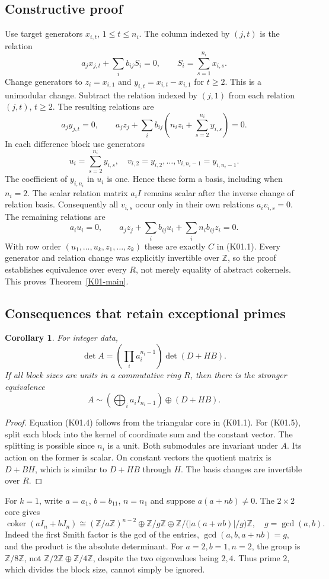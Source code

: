 \documentclass[11pt,a4paper]{article}
\newtheorem{corollary}[theorem]{Corollary}
\theoremstyle{definition}\newtheorem{definition}[theorem]{Definition}
\theoremstyle{remark}\newtheorem{remark}[theorem]{Remark}
\newcommand{\Z}{\mathbb Z}\newcommand{\Q}{\mathbb Q}\newcommand{\F}{\mathbb F}
\DeclareMathOperator{\coker}{coker}\DeclareMathOperator{\diag}{diag}\DeclareMathOperator{\rank}{rank}
\numberwithin{equation}{section}
\begin{document}
\subsection{Constructive proof}\label{K01-sec-2}
Use target generators $x_{i,t}$, $1\leq t\leq n_i$. The column indexed by $(j,t)$ is the relation
\[
 a_jx_{j,t}+\sum_i b_{ij}S_i=0,
 \qquad S_i=\sum_{s=1}^{n_i}x_{i,s}.
\]
Change generators to $z_i=x_{i,1}$ and $y_{i,t}=x_{i,t}-x_{i,1}$ for $t\geq2$. This is a unimodular change. Subtract the relation indexed by $(j,1)$ from each relation $(j,t)$, $t\geq2$. The resulting relations are
\[
 a_jy_{j,t}=0,\qquad
 a_jz_j+\sum_i b_{ij}\left(n_iz_i+\sum_{s=2}^{n_i}y_{i,s}\right)=0. \tag{K01.3}
\]
In each difference block use generators
\[
 u_i=\sum_{s=2}^{n_i}y_{i,s},\quad
 v_{i,2}=y_{i,2},\ldots,v_{i,n_i-1}=y_{i,n_i-1}.
\]
The coefficient of $y_{i,n_i}$ in $u_i$ is one. Hence these form a basis, including when $n_i=2$. The scalar relation matrix $a_iI$ remains scalar after the inverse change of relation basis. Consequently all $v_{i,s}$ occur only in their own relations $a_iv_{i,s}=0$. The remaining relations are
\[
 a_iu_i=0,\qquad
 a_jz_j+\sum_i b_{ij}u_i+\sum_i n_ib_{ij}z_i=0.
\]
With row order $(u_1,\ldots,u_k,z_1,\ldots,z_k)$ these are exactly $C$ in (K01.1). Every generator and relation change was explicitly invertible over $\Z$, so the proof establishes equivalence over every $R$, not merely equality of abstract cokernels. This proves Theorem~\ref{K01-main}.

\subsection{Consequences that retain exceptional primes}\label{K01-sec-3}
\begin{corollary}
For integer data,
\[
 \det A=\left(\prod_i a_i^{n_i-1}\right)\det(D+HB).               \tag{K01.4}
\]
If all block sizes are units in a commutative ring $R$, then there is the stronger equivalence
\[
 A\sim\left(\bigoplus_i a_iI_{n_i-1}\right)\oplus(D+HB).          \tag{K01.5}
\]
\end{corollary}
\begin{proof}
Equation (K01.4) follows from the triangular core in (K01.1). For (K01.5), split each block into the kernel of coordinate sum and the constant vector. The splitting is possible since $n_i$ is a unit. Both submodules are invariant under $A$. Its action on the former is scalar. On constant vectors the quotient matrix is $D+BH$, which is similar to $D+HB$ through $H$. The basis changes are invertible over $R$.
\end{proof}
For $k=1$, write $a=a_1$, $b=b_{11}$, $n=n_1$ and suppose $a(a+nb)\ne0$. The $2\times2$ core gives
\[
 \coker(aI_n+bJ_n)\cong
 (\Z/a\Z)^{n-2}\oplus\Z/g\Z\oplus\Z/\bigl(|a(a+nb)|/g\bigr)\Z,
 \quad g=\gcd(a,b).                                           \tag{K01.6}
\]
Indeed the first Smith factor is the gcd of the entries, $\gcd(a,b,a+nb)=g$, and the product is the absolute determinant. For $a=2,b=1,n=2$, the group is $\Z/8\Z$, not $\Z/2\Z\oplus\Z/4\Z$, despite the two eigenvalues being $2,4$. Thus prime $2$, which divides the block size, cannot simply be ignored.
\end{document}
